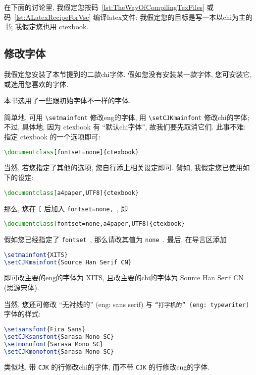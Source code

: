 在下面的讨论里,
我假定您按码~\ref{lst:TheWayOfCompilingTexFiles}
或码~\ref{lst:ALatexRecipeForVsc}
编译\gls{latex}文件;
我假定您的目标是写一本以\gls{chi}为主的书;
我假定您也用 \textsf{ctexbook}.

\subsection{修改字体}

\begin{remark*}
    我假定您安装了本节提到的二款\gls{chi}字体.
    假如您没有安装某一款字体,
    您可安装它,
    或选用您喜欢的字体.
\end{remark*}

本书选用了一些跟初始字体不一样的字体.

简单地, 可用 \verb`\setmainfont` 修改\gls{eng}的字体,
用 \verb`\setCJKmainfont` 修改\gls{chi}的字体;
不过, 具体地,
因为 \textsf{ctexbook} 有 ``默认\gls{chi}字体'',
故我们要先取消它们.
此事不难:
指定 \textsf{ctexbook} 的一个选项即可:
\begin{lstlisting}[language=TeX]
\documentclass[fontset=none]{ctexbook}
\end{lstlisting}
当然, 若您指定了其他的选项, 您自行添上相关设定即可.
譬如, 我假定您已使用如下的设定:
\begin{lstlisting}[language=TeX]
\documentclass[a4paper,UTF8]{ctexbook}
\end{lstlisting}
那么, 您在 \verb`[` 后加入 \verb`fontset=none,`~, 即
\begin{lstlisting}[language=TeX]
\documentclass[fontset=none,a4paper,UTF8]{ctexbook}
\end{lstlisting}
假如您已经指定了 \verb`fontset`~,
那么请改其值为 \verb`none`~.
最后, 在导言区添加
\begin{lstlisting}[language=TeX]
\setmainfont{XITS}
\setCJKmainfont{Source Han Serif CN}
\end{lstlisting}
即可改主要的\gls{eng}的字体为 XITS,
且改主要的\gls{chi}的字体为 Source Han Serif CN (思源宋体).

当然, 您还可修改
\textsf{``无衬线的'' (\gls{eng}: sans serif)}
与
\texttt{``打字机的'' (\gls{eng}: typewriter)}
字体的样式:
\begin{lstlisting}[language=TeX]
\setsansfont{Fira Sans}
\setCJKsansfont{Sarasa Mono SC}
\setmonofont{Sarasa Mono SC}
\setCJKmonofont{Sarasa Mono SC}
\end{lstlisting}
类似地, 带 \verb`CJK` 的行修改\gls{chi}的字体,
而不带 \verb`CJK` 的行修改\gls{eng}的字体.

